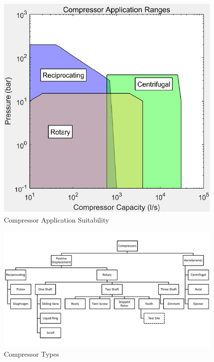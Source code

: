\begin{figure}
\includegraphics[width = \columnwidth]{./Images/CompApps.pdf}
\caption{Compressor Application Suitability}
\label{fig:CompApps}
\end{figure}

\begin{figure}
\includegraphics[width = \textwidth]{./Images/CompressorClassification.pdf}
\caption{Compressor Types}
\label{fig:comptypes}
\end{figure}


